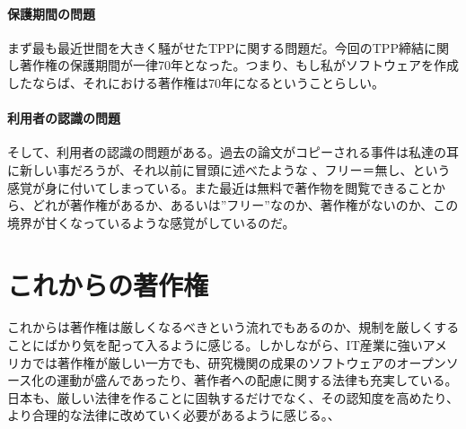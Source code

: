 \documentclass[a4j]{jsarticle}
\begin{document}
\subsection*{保護期間の問題}
まず最も最近世間を大きく騒がせたTPPに関する問題だ。今回のTPP締結に関し著作権の保護期間が一律70年となった。つまり、もし私がソフトウェアを作成したならば、それにおける著作権は70年になるということらしい。\cite{def-re}
\subsection*{利用者の認識の問題}
そして、利用者の認識の問題がある。過去の論文がコピーされる事件は私達の耳に新しい事だろうが、それ以前に冒頭に述べたような 、フリー＝無し、という感覚が身に付いてしまっている。また最近は無料で著作物を閲覧できることから、どれが著作権があるか、あるいは”フリー”なのか、著作権がないのか、この境界が甘くなっているような感覚がしているのだ。
\part{これからの著作権}
これからは著作権は厳しくなるべきという流れでもあるのか、規制を厳しくすることにばかり気を配って入るように感じる。しかしながら、IT産業に強いアメリカでは著作権が厳しい一方でも、研究機関の成果のソフトウェアのオープンソース化の運動が盛んであったり、著作者への配慮に関する法律も充実している。日本も、厳しい法律を作ることに固執するだけでなく、その認知度を高めたり、より合理的な法律に改めていく必要があるように感じる。\cite{def_m_o}、



\end{document}
